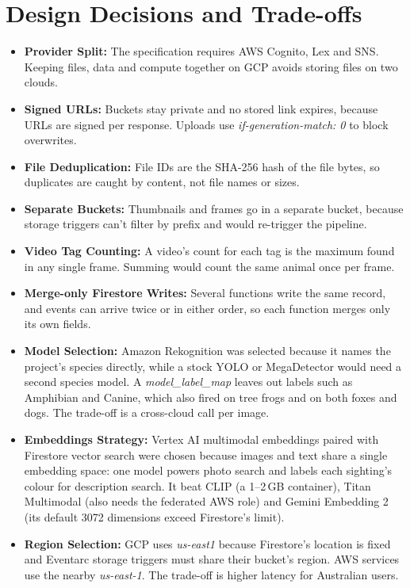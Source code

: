 \documentclass[12pt,a4paper]{article}
\newcommand{\code}[1]{\textit{#1}} %
\begin{document}
\section{Design Decisions and Trade-offs}

\begin{itemize}
  \item \textbf{Provider Split:} The specification requires AWS Cognito, Lex and SNS. Keeping files, data and compute together on GCP avoids storing files on two clouds.
  \item \textbf{Signed URLs:} Buckets stay private and no stored link expires, because URLs are signed per response. Uploads use \code{if-generation-match: 0} to block overwrites.
  \item \textbf{File Deduplication:} File IDs are the SHA-256 hash of the file bytes, so duplicates are caught by content, not file names or sizes.
  \item \textbf{Separate Buckets:} Thumbnails and frames go in a separate bucket, because storage triggers can't filter by prefix and would re-trigger the pipeline.
  \item \textbf{Video Tag Counting:} A video's count for each tag is the maximum found in any single frame. Summing would count the same animal once per frame.
  \item \textbf{Merge-only Firestore Writes:} Several functions write the same record, and events can arrive twice or in either order, so each function merges only its own fields.
  \item \textbf{Model Selection:} Amazon Rekognition was selected because it names the project's species directly, while a stock YOLO or MegaDetector would need a second species model. A \code{model\_label\_map} leaves out labels such as Amphibian and Canine, which also fired on tree frogs and on both foxes and dogs. The trade-off is a cross-cloud call per image.
  \item \textbf{Embeddings Strategy:} Vertex AI multimodal embeddings paired with Firestore vector search were chosen because images and text share a single embedding space: one model powers photo search and labels each sighting's colour for description search. It beat CLIP (a 1--2\,GB container), Titan Multimodal (also needs the federated AWS role) and Gemini Embedding 2 (its default 3072 dimensions exceed Firestore's limit).
  \item \textbf{Region Selection:} GCP uses \code{us-east1} because Firestore's location is fixed and Eventarc storage triggers must share their bucket's region. AWS services use the nearby \code{us-east-1}. The trade-off is higher latency for Australian users.
\end{itemize}
\end{document}

